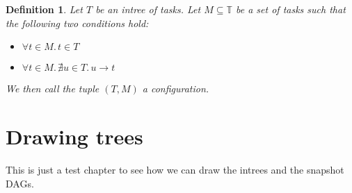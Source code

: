 \documentclass[letter]{report}
\newtheorem{definition}{Definition}[chapter]
\newcommand{\alltasks}{{\mathbb T}}
\newcommand{\neededfor}{\rightarrow}
\begin{document}
\begin{definition}
  Let $T$ be an intree of tasks. Let $M\subseteq\alltasks$ be a set of tasks such that the following two conditions hold:
  \begin{itemize}
  \item $\forall t\in M.\, t \in T$
  \item $\forall t\in M.\, \nexists u \in T.\, u\neededfor t $
  \end{itemize}
  We then call the tuple $\left( T, M \right)$ a \emph{configuration}.
\end{definition}

\chapter{Drawing trees}
\label{chap:drawing-trees}

This is just a test chapter to see how we can draw the intrees and the snapshot DAGs.
\newsavebox{\nodebox}
\end{document}
